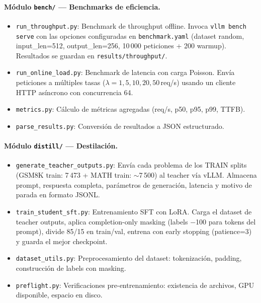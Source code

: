 \documentclass[11pt,a4paper]{article}
\begin{document}
\paragraph{M\'odulo \texttt{bench/} --- Benchmarks de eficiencia.}
\begin{itemize}[leftmargin=2em]
  \item \texttt{run\_throughput.py}: Benchmark de throughput offline.
    Invoca \texttt{vllm bench serve} con las opciones configuradas en
    \texttt{benchmark.yaml} (dataset random, input\_len=512,
    output\_len=256, 10\,000 peticiones + 200 warmup). Resultados se
    guardan en \texttt{results/throughput/}.
  \item \texttt{run\_online\_load.py}: Benchmark de latencia con carga
    Poisson. Env\'ia peticiones a m\'ultiples tasas ($\lambda = 1, 5,
    10, 20, 50$\,req/s) usando un cliente HTTP as\'incrono con
    concurrencia 64.
  \item \texttt{metrics.py}: C\'alculo de m\'etricas agregadas
    (req/s, p50, p95, p99, TTFB).
  \item \texttt{parse\_results.py}: Conversi\'on de resultados a JSON
    estructurado.
\end{itemize}

\paragraph{M\'odulo \texttt{distill/} --- Destilaci\'on.}
\begin{itemize}[leftmargin=2em]
  \item \texttt{generate\_teacher\_outputs.py}: Env\'ia cada problema
    de los TRAIN splits (GSM8K train: 7\,473 + MATH train:
    $\sim$7\,500) al teacher v\'ia vLLM. Almacena prompt, respuesta
    completa, par\'ametros de generaci\'on, latencia y motivo de parada
    en formato JSONL.
  \item \texttt{train\_student\_sft.py}: Entrenamiento SFT con LoRA.
    Carga el dataset de teacher outputs, aplica completion-only masking
    (labels $-$100 para tokens del prompt), divide 85/15 en train/val,
    entrena con early stopping (patience=3) y guarda el mejor checkpoint.
  \item \texttt{dataset\_utils.py}: Preprocesamiento del dataset:
    tokenizaci\'on, padding, construcci\'on de labels con masking.
  \item \texttt{preflight.py}: Verificaciones pre-entrenamiento:
    existencia de archivos, GPU disponible, espacio en disco.
\end{itemize}
\end{document}
